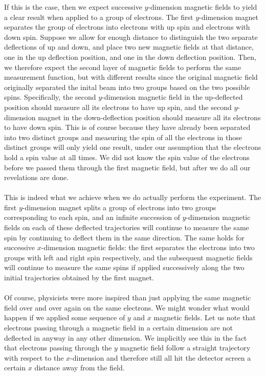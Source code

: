 If this is the case, then we expect successive $y$-dimension magnetic fields to yield a clear result when applied to a group of electrons. The first $y$-dimension magnet separates the group of electrons into electrons with up spin and electrons with down spin. Suppose we allow for enough distance to distinguish the two separate deflections of up and down, and place two new magnetic fields at that distance, one in the up deflection position, and one in the down deflection position. Then, we therefore expect the second layer of magnetic fields to perform the same measurement function, but with different results since the original magnetic field originally separated the inital beam into two groups based on the two possible spins. Specifically, the second $y$-dimension magnetic field in the up-deflected position should measure all its electrons to have up spin, and the second $y$-dimension magnet in the down-deflection position should measure all its electrons to have down spin. This is of course because they have already been separated into two distinct groups and measuring the spin of all the electrons in those distinct groups will only yield one result, under our assumption that the electrons hold a spin value at all times. We did not know the spin value of the electrons before we passed them through the first magnetic field, but after we do all our revelations are done.
\\\\
This is indeed what we achieve when we do actually perform the experiment. The first $y$-dimension magnet splits a group of electrons into two groups corresponding to each spin, and an infinite succession of $y$-dimension magnetic fields on each of these deflected trajectories will continue to measure the same spin by continuing to deflect them in the same direction. The same holds for successive $x$-dimension magnetic fields: the first separates the electrons into two groups with left and right spin respectively, and the subsequent magnetic fields will continue to measure the same spins if applied successively along the two initial trajectories obtained by the first magnet.
\\\\
Of course, physicists were more inspired than just applying the same magnetic field over and over again on the same electrons. We might wonder what would happen if we applied some sequence of $y$ and $x$ magnetic fields. Let us note that electrons passing through a magnetic field in a certain dimension are not deflected in anyway in any other dimension. We implicitly see this in the fact that electrons passing through the $y$ magnetic field follow a straight trajectory with respect to the $x$-dimension and therefore still all hit the detector screen a certain $x$ distance away from the field.
